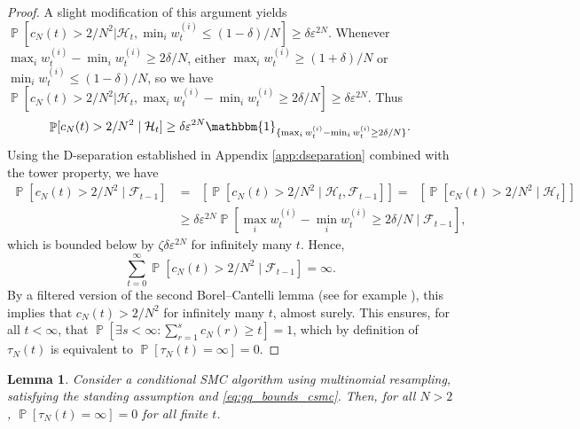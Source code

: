 \documentclass{article} %
\newtheorem{lemma}{Lemma}
\theoremstyle{definition}
\DeclareMathOperator{\Prob}{\mathbb{P}}
\DeclareMathOperator{\Et}{\mathbb{E}_t}
\newcommand{\1}[1]{\mathbbm{1}_{\{#1\}}}
\begin{document}
\begin{proof}
A slight modification of this argument yields $\Prob[ c_N(t) > 2/N^2 | \mathcal{H}_t, \min_i w_t^{(i)} \leq (1-\delta)/N ] \geq \delta \varepsilon^{2N} $.
Whenever $\max_i w_t^{(i)} - \min_i w_t^{(i)} \geq 2\delta/N$, either $\max_i w_t^{(i)} \geq (1+\delta)/N$ or $\min_i w_t^{(i)} \leq (1-\delta)/N$, so we have 
$\Prob[ c_N(t) > 2/N^2 | \mathcal{H}_t, \max_i w_t^{(i)} - \min_i w_t^{(i)} \geq 2\delta/N ] \geq \delta \varepsilon^{2N}$.
Thus 
\begin{equation*}
\Prob[ c_N(t)>2/N^2 \mid \mathcal{H}_t ] \geq \delta \varepsilon^{2N}\1{\max_i w_t^{(i)} - \min_i w_t^{(i)} \geq 2\delta/N} .
\end{equation*}
Using the D-separation established in Appendix \ref{app:dseparation} combined with the tower property, we have
\begin{align*}
\Prob[ c_N(t)>2/N^2 \mid \mathcal{F}_{t-1} ]
&=\Et\left[ \Prob[ c_N(t)>2/N^2 \mid \mathcal{H}_t, \mathcal{F}_{t-1} ] \right]
=\Et\left[ \Prob[ c_N(t)>2/N^2 \mid \mathcal{H}_t ] \right] \\
&\geq \delta \varepsilon^{2N} \Prob[ \max_i w_t^{(i)} - \min_i w_t^{(i)} \geq 2\delta/N \mid \mathcal{F}_{t-1} ] ,
\end{align*}
which is bounded below by $ \zeta \delta \varepsilon^{2N} $ for infinitely many $t$. 
Hence,
\begin{equation*}
\sum_{t=0}^\infty \Prob[ c_N(t) > 2/N^2 \mid \mathcal{F}_{t-1} ] = \infty .
\end{equation*}
By a filtered version of the second Borel--Cantelli lemma (see for example \cite[Theorem 4.3.4]{durrett2019}), this implies that $c_N(t) >2/N^2$ for infinitely many $t$, almost surely.
This ensures, for all $t <\infty$, that $\Prob\left[ \exists s<\infty : \sum_{r=1}^s c_N(r) \geq t \right] =1$, which by definition of $\tau_N(t)$ is equivalent to $\Prob[ \tau_N(t) = \infty ] =0$.
\end{proof}


\begin{lemma}\label{thm:CSMC_nontriviality}
Consider a conditional SMC algorithm using multinomial resampling, satisfying the standing assumption and \eqref{eq:gq_bounds_csmc}. 
Then, for all $N>2$, $\Prob[ \tau_N(t) = \infty ]=0$ for all finite $t$.
\end{lemma}
\end{document}
